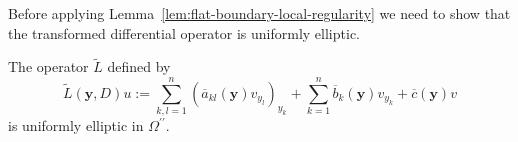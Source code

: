 Before applying Lemma~\ref{lem:flat-boundary-local-regularity} we need to show that the transformed differential operator is uniformly elliptic.

\begin{Lemma}
\label{lem:boundary-transformed-uniform-ellipticity}
The operator $\widetilde L$ defined by
\begin{equation}\label{eq:boundary-transformed-second-order-operator}
\widetilde L(\bm{y},D)u:=\sum_{k,l=1}^n(\overline a_{kl}(\bm{y})v_{y_l})_{y_k}+\sum_{k=1}^n\overline b_k(\bm{y})v_{y_k}+\overline c(\bm{y})v
\end{equation}
is uniformly elliptic in $\Omega^{\prime\prime}$.
\end{Lemma}

\begingroup
\renewcommand{\endProof}{\par\nobreak\hfill$\blacksquare$\par\vspace{0.1cm}}
